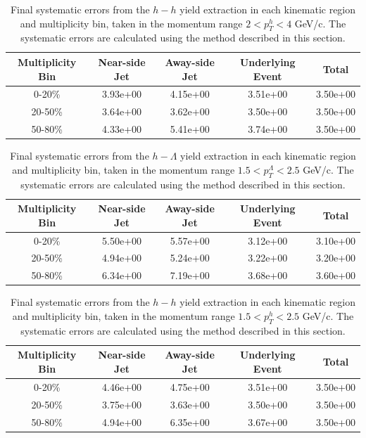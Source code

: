 \documentclass[ALICE,manyauthors]{ALICE_analysis_notes}
\begin{document}
\begin{table}[h!]
\centering
\begin{tabular}{| c | c | c | c | c | }
\hline
Multiplicity Bin & Near-side Jet & Away-side Jet & Underlying Event & Total  \\
\hline

0-20\% & 3.93e+00   & 4.15e+00  & 3.51e+00 & 3.50e+00 \\
20-50\% & 3.64e+00 & 3.62e+00  & 3.50e+00 & 3.50e+00 \\
50-80\% & 4.33e+00 & 5.41e+00  & 3.74e+00 & 3.50e+00 \\

\hline
\end{tabular}
\caption{Final systematic errors from the $h-h$ yield extraction in each kinematic region and multiplicity bin, taken in the momentum range $2 < p_{T}^{h} < 4$ GeV/c. The systematic errors are calculated using the method described in this section.}
\label{h_h_yield_extraction_systematics}
\end{table}

\begin{table}[h!]
\centering
\begin{tabular}{| c | c | c | c | c | }
\hline
Multiplicity Bin & Near-side Jet & Away-side Jet & Underlying Event & Total  \\
\hline

0-20\% & 5.50e+00 & 5.57e+00  & 3.12e+00 & 3.10e+00 \\
20-50\% & 4.94e+00 & 5.24e+00  & 3.22e+00 & 3.20e+00 \\
50-80\% & 6.34e+00 & 7.19e+00  & 3.68e+00 & 3.60e+00 \\

\hline
\end{tabular}
\caption{Final systematic errors from the $h-\Lambda$ yield extraction in each kinematic region and multiplicity bin, taken in the momentum range $1.5 < p_{T}^{\Lambda} < 2.5$ GeV/c. The systematic errors are calculated using the method described in this section.}
\label{h_lambda_yield_extraction_systematics_lowpt}
\end{table}

\begin{table}[h!]
\centering
\begin{tabular}{| c | c | c | c | c | }
\hline
Multiplicity Bin & Near-side Jet & Away-side Jet & Underlying Event & Total  \\
\hline

0-20\% & 4.46e+00   & 4.75e+00  & 3.51e+00 & 3.50e+00 \\
20-50\% & 3.75e+00 & 3.63e+00  & 3.50e+00 & 3.50e+00 \\
50-80\% & 4.94e+00 & 6.35e+00  & 3.67e+00 & 3.50e+00 \\

\hline
\end{tabular}
\caption{Final systematic errors from the $h-h$ yield extraction in each kinematic region and multiplicity bin, taken in the momentum range $1.5 < p_{T}^{h} < 2.5$ GeV/c. The systematic errors are calculated using the method described in this section.}
\label{h_h_yield_extraction_systematics_lowpt}
\end{table}
\end{document}
